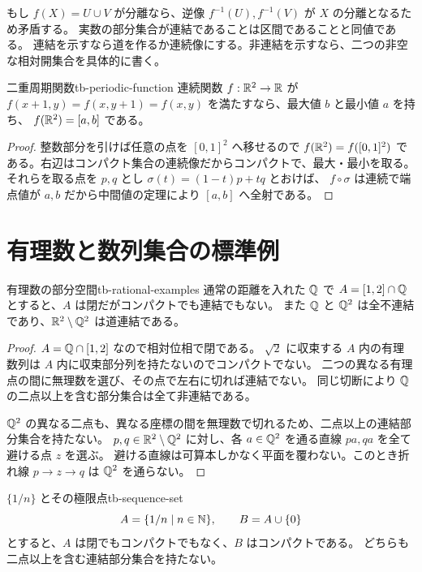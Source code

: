もし $f(X)=U\cup V$ が分離なら、逆像 $f^{-1}(U),f^{-1}(V)$ が $X$ の分離となるため矛盾する。
実数の部分集合が連結であることは区間であることと同値である。
連結を示すなら道を作るか連続像にする。非連結を示すなら、二つの非空な相対開集合を具体的に書く。

\begin{proposition}{二重周期関数}{tb-periodic-function}
連続関数 $f:\mathbb{R}^2\to\mathbb{R}$ が
$f(x+1,y)=f(x,y+1)=f(x,y)$ を満たすなら、最大値 $b$ と最小値 $a$ を持ち、
$f(\mathbb{R}^2)=[a,b]$ である。
\end{proposition}

\begin{proof}
整数部分を引けば任意の点を $[0,1]^2$ へ移せるので
$f(\mathbb{R}^2)=f([0,1]^2)$ である。右辺はコンパクト集合の連続像だからコンパクトで、最大・最小を取る。
それらを取る点を $p,q$ とし $\sigma(t)=(1-t)p+tq$ とおけば、
$f\circ\sigma$ は連続で端点値が $a,b$ だから中間値の定理により $[a,b]$ へ全射である。
\end{proof}

\section{有理数と数列集合の標準例}

\begin{proposition}{有理数の部分空間}{tb-rational-examples}
通常の距離を入れた $\mathbb{Q}$ で $A=[1,2]\cap\mathbb{Q}$ とすると、$A$ は閉だがコンパクトでも連結でもない。
また $\mathbb{Q}$ と $\mathbb{Q}^2$ は全不連結であり、$\mathbb{R}^2\setminus\mathbb{Q}^2$ は道連結である。
\end{proposition}

\begin{proof}
$A=\mathbb{Q}\cap[1,2]$ なので相対位相で閉である。
$\sqrt2$ に収束する $A$ 内の有理数列は $A$ 内に収束部分列を持たないのでコンパクトでない。
二つの異なる有理点の間に無理数を選び、その点で左右に切れば連結でない。
同じ切断により $\mathbb{Q}$ の二点以上を含む部分集合は全て非連結である。

$\mathbb{Q}^2$ の異なる二点も、異なる座標の間を無理数で切れるため、二点以上の連結部分集合を持たない。
$p,q\in\mathbb{R}^2\setminus\mathbb{Q}^2$ に対し、各 $a\in\mathbb{Q}^2$ を通る直線 $pa,qa$ を全て避ける点 $z$ を選ぶ。
避ける直線は可算本しかなく平面を覆わない。このとき折れ線 $p\to z\to q$ は $\mathbb{Q}^2$ を通らない。
\end{proof}

\begin{proposition}{$\{1/n\}$ とその極限点}{tb-sequence-set}
\[
A=\{1/n\mid n\in\mathbb{N}\},\qquad B=A\cup\{0\}
\]
とすると、$A$ は閉でもコンパクトでもなく、$B$ はコンパクトである。
どちらも二点以上を含む連結部分集合を持たない。
\end{proposition}

